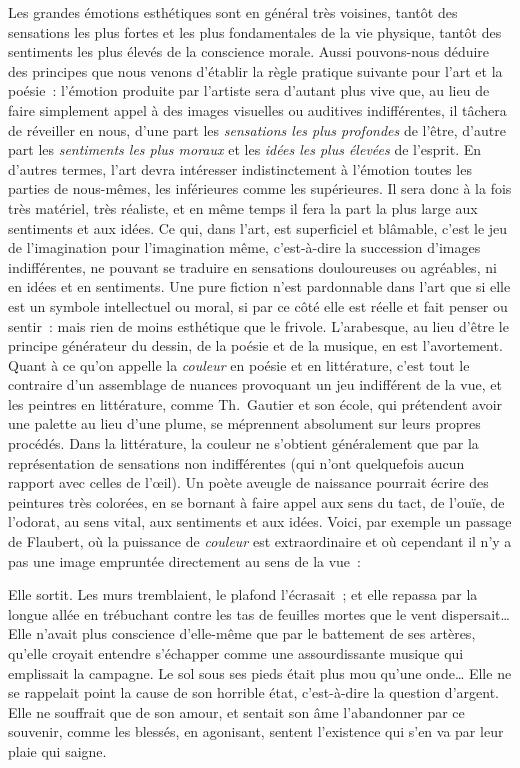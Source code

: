 \documentclass[french,twoside]{book} %
\newenvironment{quoteblock}%
  {\begin{quoting}}
  {\end{quoting}}
\newenvironment{quotebar}{%
    \def\FrameCommand{{\color{rubric!10!}\vrule width 0.5em} \hspace{0.9em}}%
    \def\OuterFrameSep{\itemsep} %
    \MakeFramed {\advance\hsize-\width \FrameRestore}
  }%
  {%
    \endMakeFramed
  }
\renewenvironment{quoteblock}%
  {%
    \savenotes
    \setstretch{0.9}
    \normalfont
    \begin{quotebar}
  }
  {%
    \end{quotebar}
    \spewnotes
  }
\begin{document}
Les grandes émotions esthétiques sont en général très  voisines, tantôt des sensations les plus fortes et les plus fondamentales de la vie physique, tantôt des sentiments les plus élevés de la conscience morale. Aussi pouvons-nous déduire des principes que nous venons d’établir la règle pratique suivante pour l’art et la poésie : l’émotion produite par l’artiste sera d’autant plus vive que, au lieu de faire simplement appel à des images visuelles ou auditives indifférentes, il tâchera de réveiller en nous, d’une part les \emph{sensations les plus profondes} de l’être, d’autre part les \emph{sentiments les plus moraux} et les \emph{idées les plus élevées} de l’esprit. En d’autres termes, l’art devra intéresser indistinctement à l’émotion toutes les parties de nous-mêmes, les inférieures comme les supérieures. Il sera donc à la fois très matériel, très réaliste, et en même temps il fera la part la plus large aux sentiments et aux idées. Ce qui, dans l’art, est superficiel et blâmable, c’est le jeu de l’imagination pour l’imagination même, c’est-à-dire la succession d’images indifférentes, ne pouvant se traduire en sensations douloureuses ou agréables, ni en idées et en sentiments. Une pure fiction n’est pardonnable dans l’art que si elle est un symbole intellectuel ou moral, si par ce côté elle est réelle et fait penser ou sentir : mais rien de moins esthétique que le frivole. L’arabesque, au lieu d’être le principe générateur du dessin, de la poésie et de la musique, en est l’avortement. Quant à ce qu’on appelle la \emph{couleur} en poésie et en littérature, c’est tout le contraire d’un assemblage de nuances provoquant un jeu indifférent de la vue, et les peintres en littérature, comme Th. Gautier et son école, qui prétendent avoir une palette au lieu d’une  plume, se méprennent absolument sur leurs propres procédés. Dans la littérature, la couleur ne s’obtient généralement que par la représentation de sensations non indifférentes (qui n’ont quelquefois aucun rapport avec celles de l’œil). Un poète aveugle de naissance pourrait écrire des peintures très colorées, en se bornant à faire appel aux sens du tact, de l’ouïe, de l’odorat, au sens vital, aux sentiments et aux idées. Voici, par exemple un passage de Flaubert, où la puissance de \emph{couleur} est extraordinaire et où cependant il n’y a pas une image empruntée directement au sens de la vue :\par

\begin{quoteblock}
 \noindent Elle sortit. Les murs tremblaient, le plafond l’écrasait ; et elle repassa par la longue allée en trébuchant contre les tas de feuilles mortes que le vent dispersait… Elle n’avait plus conscience d’elle-même que par le battement de ses artères, qu’elle croyait entendre s’échapper comme une assourdissante musique qui emplissait la campagne. Le sol sous ses pieds était plus mou qu’une onde… Elle ne se rappelait point la cause de son horrible état, c’est-à-dire la question d’argent. Elle ne souffrait que de son amour, et sentait son âme l’abandonner par ce souvenir, comme les blessés, en agonisant, sentent l’existence qui s’en va par leur plaie qui saigne.
 \end{quoteblock}
\end{document}
